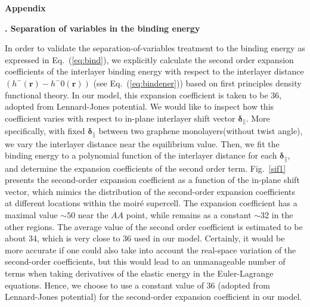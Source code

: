 \documentclass[aps,prx,10pt,twocolumn,superscriptaddress]{revtex4}
\def\I{\uppercase\expandafter{\romannumeral 1}}
\begin{document}
\begin{widetext}
\clearpage

\begin{center}
\textbf{\large Appendix}
\end{center}

\vspace{12pt}
\begin{center}
\textbf{\large \I. Separation of variables in the binding energy}
\end{center}



In order to validate the separation-of-variables treatment to the binding energy as expressed in Eq.~(\ref{eq:bind}), we explicitly calculate the second order expansion coefficients of the interlayer binding energy  with respect to the interlayer distance $(h^{-}(\textbf{r})-h^{-}{0}(\textbf{r}))$ (see Eq.~(\ref{eq:bindener})) based on first principles density functional theory. In our model, this expansion coefficient is taken to be 36, adopted from Lennard-Jones potential. We would like to inspect how this coefficient varies with respect to in-plane interlayer shift vector $\bm{\delta}_{\parallel}$.
More specifically, with  fixed $\bm{\delta}_{\parallel}$ between two graphene monolayers(without twist angle), we vary the interlayer distance near the equilibrium value. Then, we fit the binding energy to a polynomial function of the interlayer distance for each $\bm{\delta}_{\parallel}$, and determine the expansion coefficients of the second order term. Fig.~\ref{sif1} presents the second-order expansion coefficient as a function of the in-plane shift vector, which mimics the distribution of the second-order expansion coefficients at different locations within the moir\'e supercell. The expansion coefficient has a maximal value $\sim 50$ near the $AA$ point, while remains as a constant $\sim$32 in the other regions. The average value of the second order coefficient is estimated to be about 34, which is very close to 36 used in our model. Certainly, it would be more accurate if one could also take into account the real-space variation of the second-order coefficients, but this would lead to an unmanageable number of terms when taking derivatives of the elastic energy in the Euler-Lagrange equations. Hence, we choose to use a constant value of 36 (adopted from Lennard-Jones potential) for the second-order expansion coefficient in our model.


\end{widetext}
\end{document}
